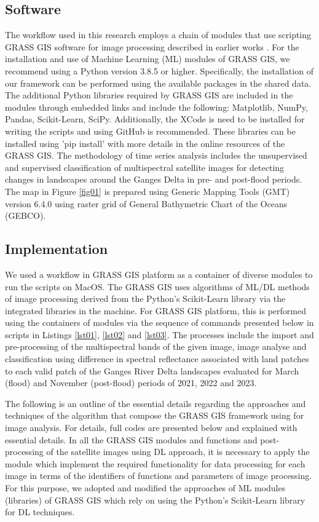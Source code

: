 \documentclass[water,article,submit,pdftex,moreauthors]{Definitions/mdpi}
\begin{document}
\subsection{Software}
The workflow used in this research employs a chain of modules that use scripting GRASS GIS software \cite{GRASS_GIS_software} for image processing described in earlier works \cite{Lemenkova202323,technologies11020046}. For the installation and use of Machine Learning (ML) modules of GRASS GIS, we recommend using a Python version 3.8.5 or higher. Specifically, the installation of our framework can be performed using the available packages in the shared data. The additional Python libraries required by GRASS GIS are included in the modules through embedded links and include the following: Matplotlib, NumPy, Pandas, Scikit-Learn, SciPy. Additionally, the XCode is need to be installed for writing the scripts and using GitHub is recommended. These libraries can be installed using 'pip install' with more details in the online resources of the GRASS GIS. The methodology of time series analysis includes the unsupervised and supervised classification of multispectral satellite images for detecting changes in landscapes around the Ganges Delta in pre- and post-flood periods. The map in Figure \ref{fig01} is prepared using Generic Mapping Tools (GMT) version 6.4.0 \cite{Wessel} using raster grid of General Bathymetric Chart of the Oceans (GEBCO). 

\subsection{Implementation}
We used a workflow in GRASS GIS platform as a container of diverse modules to run the scripts on MacOS. The GRASS GIS uses algorithms of ML/DL methods of image processing derived from the Python's Scikit-Learn library via the integrated libraries in the machine. For GRASS GIS platform, this is performed using the containers of modules via the sequence of commands presented below in scripts in Listings \ref{lst01}, \ref{lst02} and \ref{lst03}. The processes include the import and pre-processing of the multispectral bands of the given image, image analyse and classification using difference in spectral reflectance associated with land patches to each valid patch of the Ganges River Delta landscapes evaluated for March (flood) and November (post-flood) periods of 2021, 2022 and 2023.

The following is an outline of the essential details regarding the approaches and techniques of the algorithm that compose the GRASS GIS framework using for image analysis. For details, full codes are presented below and explained with essential details. In all the GRASS GIS modules and functions and post-processing of the satellite images using DL approach, it is necessary to apply the module which implement the required functionality for data processing for each image in terms of the identifiers of functions and parameters of image processing. For this purpose, we adopted and modified the approaches of ML modules (libraries) of GRASS GIS which rely on using the Python's Scikit-Learn library for DL techniques.
\end{document}
